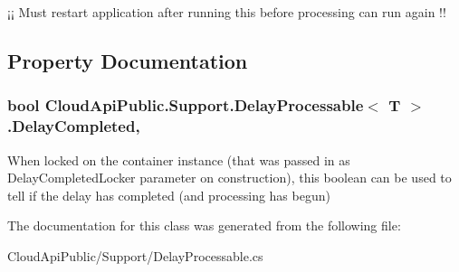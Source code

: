 ¡¡ Must restart application after running this before processing can run again !! 



\subsection{Property Documentation}
\hypertarget{class_cloud_api_public_1_1_support_1_1_delay_processable_3_01_t_01_4_a9605535bcda38d09fc9aece45f7b4003}{
\subsubsection[{Delay\-Completed}]{\setlength{\rightskip}{0pt plus 5cm}bool Cloud\-Api\-Public.\-Support.\-Delay\-Processable$<$ T $>$.Delay\-Completed\hspace{0.3cm}{\ttfamily [get]}, {\ttfamily [set]}}}\label{class_cloud_api_public_1_1_support_1_1_delay_processable_3_01_t_01_4_a9605535bcda38d09fc9aece45f7b4003}


When locked on the container instance (that was passed in as Delay\-Completed\-Locker parameter on construction), this boolean can be used to tell if the delay has completed (and processing has begun) 



The documentation for this class was generated from the following file\-:\begin{DoxyCompactItemize}
\item 
Cloud\-Api\-Public/\-Support/Delay\-Processable.\-cs\end{DoxyCompactItemize}
